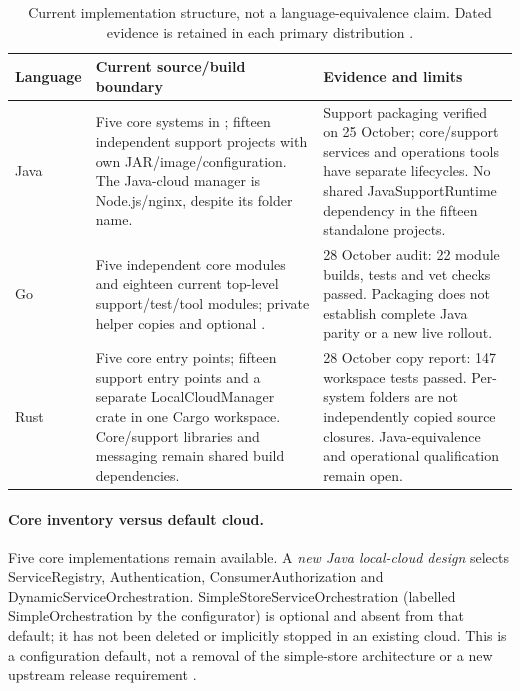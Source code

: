 \documentclass[a4paper]{arrowhead}
\begin{document}
\begin{table}[htbp]
\centering\small
\begin{tabularx}{\textwidth}{|P{1.6cm}|X|X|}\hline
{} Language & Current source/build boundary & Evidence and limits \\\hline
Java & Five core systems in ; fifteen independent
support projects with own JAR/image/configuration. The Java-cloud manager is
Node.js/nginx, despite its folder name. & Support packaging verified on
25 October; core/support services and operations tools have separate lifecycles.
No shared JavaSupportRuntime dependency in the fifteen standalone projects. \\\hline
Go & Five independent core modules and eighteen current top-level support/test/tool
modules; private helper copies and optional . & 28 October audit:
22 module builds, tests and vet checks passed. Packaging does not establish
complete Java parity or a new live rollout. \\\hline
Rust & Five core entry points; fifteen support entry points and a separate
LocalCloudManager crate in one Cargo workspace. Core/support libraries and
messaging remain shared build dependencies. & 28 October copy report:
147 workspace tests passed. Per-system folders are not independently copied
source closures. Java-equivalence and operational qualification remain open. \\\hline
\end{tabularx}
\caption{Current implementation structure, not a language-equivalence claim.
Dated evidence is retained in each primary distribution
\cite{javaPackaging20261025,goPackaging20261028,rustPackaging20261028}.}
\end{table}
\FloatBarrier

\paragraph{Core inventory versus default cloud.}
Five core implementations remain available. A \emph{new Java local-cloud design}
selects ServiceRegistry, Authentication, ConsumerAuthorization and
DynamicServiceOrchestration. SimpleStoreServiceOrchestration (labelled
SimpleOrchestration by the configurator) is optional and absent from that default;
it has not been deleted or implicitly stopped in an existing cloud. This is a
configuration default, not a removal of the simple-store architecture or a new
upstream release requirement \cite{javaLocalCloud20261030}.
\end{document}

